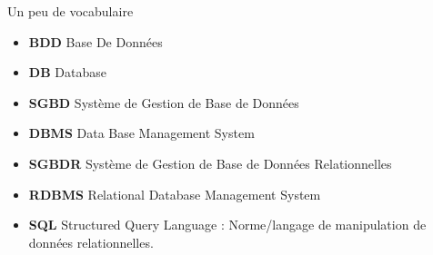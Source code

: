 \documentclass[xetex,dvipsnames]{beamer}
\begin{document}
\begin{frame}{Un peu de vocabulaire}
	\begin{itemize}
		\item \textbf{BDD} Base De Données
		\item \textbf{DB} Database
	\end{itemize}
	\vspace{1em}
	\begin{itemize}
		\item \textbf{SGBD} Système de Gestion de Base de Données 
		\item \textbf{DBMS} Data Base Management System
	\end{itemize}
	\vspace{1em}
	\begin{itemize}
			\item \textbf{SGBDR} Système de Gestion de Base de Données Relationnelles
			\item \textbf{RDBMS} Relational Database Management System 
	\end{itemize}
	\vspace{1em}
	
	\begin{itemize}
		\item \textbf{SQL} Structured Query Language : Norme/langage de manipulation de données relationnelles.
	\end{itemize}
\end{frame}
\end{document}

